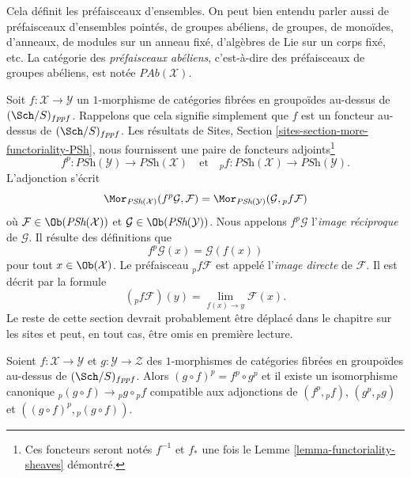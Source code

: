 \noindent
Cela définit les préfaisceaux d'ensembles. On peut bien entendu parler aussi de
préfaisceaux d'ensembles pointés, de groupes abéliens, de groupes, de monoïdes, d'anneaux,
de modules sur un anneau fixé, d'algèbres de Lie sur un corps fixé, etc.
La catégorie des {\it préfaisceaux abéliens}, c'est-à-dire des préfaisceaux de groupes
abéliens, est notée $\textit{PAb}(\mathcal{X})$.

\medskip\noindent
Soit $f : \mathcal{X} \to \mathcal{Y}$ un $1$-morphisme de catégories
fibrées en groupoïdes au-dessus de $(\Sch/S)_{fppf}$. Rappelons que cela
signifie simplement que $f$ est un foncteur au-dessus de $(\Sch/S)_{fppf}$.
Les résultats de
Sites, Section \ref{sites-section-more-functoriality-PSh},
nous fournissent une paire de foncteurs adjoints\footnote{Ces foncteurs
seront notés $f^{-1}$ et $f_*$ une fois le
Lemme \ref{lemma-functoriality-sheaves}
démontré.}
\begin{equation}
\label{equation-pushforward-pullback}
f^p : \textit{PSh}(\mathcal{Y}) \longrightarrow \textit{PSh}(\mathcal{X})
\quad\text{et}\quad
{}_pf : \textit{PSh}(\mathcal{X}) \longrightarrow \textit{PSh}(\mathcal{Y}).
\end{equation}
L'adjonction s'écrit
$$
\Mor_{\textit{PSh}(\mathcal{X})}(f^p\mathcal{G}, \mathcal{F})
=
\Mor_{\textit{PSh}(\mathcal{Y})}(\mathcal{G}, {}_pf\mathcal{F})
$$
où $\mathcal{F} \in \Ob(\textit{PSh}(\mathcal{X}))$ et
$\mathcal{G} \in \Ob(\textit{PSh}(\mathcal{Y}))$. Nous appelons
$f^p\mathcal{G}$ l'{\it image réciproque} de $\mathcal{G}$. Il résulte
des définitions que
$$
f^p\mathcal{G}(x) = \mathcal{G}(f(x))
$$
pour tout $x \in \Ob(\mathcal{X})$. Le préfaisceau ${}_pf\mathcal{F}$
est appelé l'{\it image directe} de $\mathcal{F}$. Il est décrit
par la formule
$$
({}_pf\mathcal{F})(y) = \lim_{f(x) \to y} \mathcal{F}(x).
$$
Le reste de cette section devrait probablement être déplacé dans le chapitre
sur les sites et peut, en tout cas, être omis en première lecture.

\begin{lemma}
\label{lemma-1-morphisms-presheaves}
Soient $f : \mathcal{X} \to \mathcal{Y}$ et $g : \mathcal{Y} \to \mathcal{Z}$
des $1$-morphismes de catégories fibrées en groupoïdes au-dessus de
$(\Sch/S)_{fppf}$. Alors $(g \circ f)^p = f^p \circ g^p$ et
il existe un isomorphisme canonique
${}_p(g \circ f) \to {}_pg \circ {}_pf$
compatible aux adjonctions de $(f^p, {}_pf)$, $(g^p, {}_pg)$ et
$((g \circ f)^p, {}_p(g \circ f))$.
\end{lemma}

